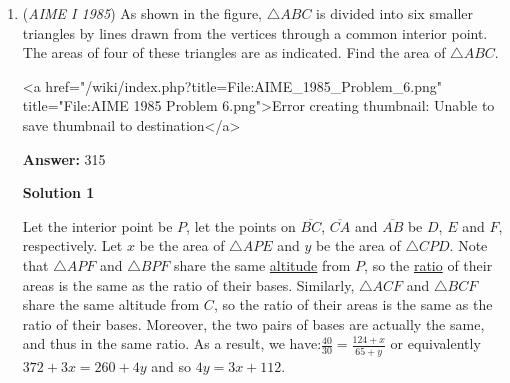 \begin{enumerate}
 If we add up all of those 6 terms we will get 0.

 Now we are given the sum of the first 1985 terms is 1492 and the sum of the first 1492 terms is 1985. 

 If the first 20 terms = $X$ then we also can say that $term 19$ + $term 20$ = $X$. Since every group of 6 will be equal to 0.

 The first 1985 terms sum to 1492 $\longrightarrow$ terms 1981, 1982, 1983, 1984, and 1985 sum to 1492.

 So $A$ + $B$ + $B$ - $A$ - $A$ - $B$ = 1492 $\longrightarrow$ $B$ - $A$ = 1492

 The first 1492 terms sum to 1985 $\longrightarrow$ terms 1489, 1490, 1491, and 1492 sum to 1985

 So $A$ + $B$ + $B$ - $A$ - $A$ = 1985 $\longrightarrow$ $2B$ - $A$ = 1985

 Now we solve given:  [$2B$ - $A$ = 1985] and [$B$ - $A$ = 1492]

 [$2B$ - $A$] - [$B$ - $A$] = 1985 - 1492 $\longrightarrow$ $B$ = 493

 [$B$ - $A$] = 1492 $\longrightarrow$ [$493$ - $A$] = 1492 $\longrightarrow$ $A$ = -999

 Now we need to find the sum of the first 2001 terms, which is the same as the sum of terms 1999, 2000, and 2001.

 So our answer is $A$ + $B$ + $B$ - $A$ $\longrightarrow$ $2B$ $\longrightarrow$ $2\cdot493$ = $\boxed{986}$.

 


	\item (\textit{AIME I 1985}) As shown in the figure, $\triangle ABC$ is divided into six smaller triangles by lines drawn from the vertices through a common interior point. The areas of four of these triangles are as indicated. Find the area of $\triangle ABC$.


 <a href="/wiki/index.php?title=File:AIME\_1985\_Problem\_6.png" title="File:AIME 1985 Problem 6.png">Error creating thumbnail: Unable to save thumbnail to destination</a>

 \textbf{Answer: }315



\textbf{Solution 1}

Let the interior point be $P$, let the points on $\overline{BC}$, $\overline{CA}$ and $\overline{AB}$ be $D$, $E$ and $F$, respectively.  Let $x$ be the area of $\triangle APE$ and $y$ be the area of $\triangle CPD$.  Note that $\triangle APF$ and $\triangle BPF$ share the same \href{https://artofproblemsolving.com/wiki/index.php?title=Altitude}{altitude} from $P$, so the \href{https://artofproblemsolving.com/wiki/index.php?title=Ratio}{ratio} of their areas is the same as the ratio of their bases.  Similarly, $\triangle ACF$ and $\triangle BCF$ share the same altitude from $C$, so the ratio of their areas is the same as the ratio of their bases.  Moreover, the two pairs of bases are actually the same, and thus in the same ratio.  As a result, we have:$\frac{40}{30} = \frac{124 + x}{65 + y}$ or equivalently $372 + 3x = 260 + 4y$ and so $4y = 3x+ 112$.


\end{enumerate}
